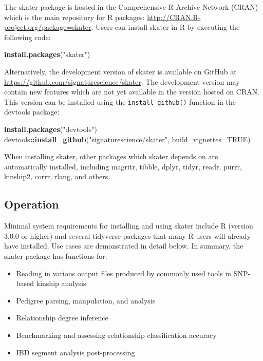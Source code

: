 \documentclass[9pt,a4paper,]{extarticle}
\newenvironment{Shaded}{\begin{snugshade}}{\end{snugshade}}
\newcommand{\DataTypeTok}[1]{\textcolor[rgb]{0.13,0.29,0.53}{#1}}
\newcommand{\KeywordTok}[1]{\textcolor[rgb]{0.13,0.29,0.53}{\textbf{#1}}}
\newcommand{\NormalTok}[1]{#1}
\newcommand{\OperatorTok}[1]{\textcolor[rgb]{0.81,0.36,0.00}{\textbf{#1}}}
\newcommand{\OtherTok}[1]{\textcolor[rgb]{0.56,0.35,0.01}{#1}}
\newcommand{\StringTok}[1]{\textcolor[rgb]{0.31,0.60,0.02}{#1}}
\begin{document}
The skater package is hosted in the Comprehensive R Archive Network (CRAN) which is the main repository for R packages: \url{http://CRAN.R-project.org/package=skater}. Users can install skater in R by executing the following code:

\begin{Shaded}
\begin{Highlighting}[]
\KeywordTok{install.packages}\NormalTok{(}\StringTok{"skater"}\NormalTok{)}
\end{Highlighting}
\end{Shaded}

Alternatively, the development version of skater is available on GitHub at \url{https://github.com/signaturescience/skater}. The development version may contain new features which are not yet available in the version hosted on CRAN. This version can be installed using the \texttt{install\_github()} function in the devtools package:

\begin{Shaded}
\begin{Highlighting}[]
\KeywordTok{install.packages}\NormalTok{(}\StringTok{"devtools"}\NormalTok{)}
\NormalTok{devtools}\OperatorTok{::}\KeywordTok{install_github}\NormalTok{(}\StringTok{"signaturescience/skater"}\NormalTok{, }\DataTypeTok{build_vignettes=}\OtherTok{TRUE}\NormalTok{)}
\end{Highlighting}
\end{Shaded}

When installing skater, other packages which skater depends on are automatically installed, including magritr, tibble, dplyr, tidyr, readr, purrr, kinship2, corrr, rlang, and others.

\hypertarget{operation}{%
\subsection{Operation}\label{operation}}

Minimal system requirements for installing and using skater include R (version 3.0.0 or higher) and several tidyverse packages \citep{Wickham2019} that many R users will already have installed. Use cases are demonstrated in detail below. In summary, the skater package has functions for:

\begin{itemize}
\item
  Reading in various output files produced by commonly used tools in SNP-based kinship analysis
\item
  Pedigree parsing, manpulation, and analysis
\item
  Relationship degree inference
\item
  Benchmarking and assessing relationship classification accuracy
\item
  IBD segment analysis post-processing
\end{itemize}
\end{document}
